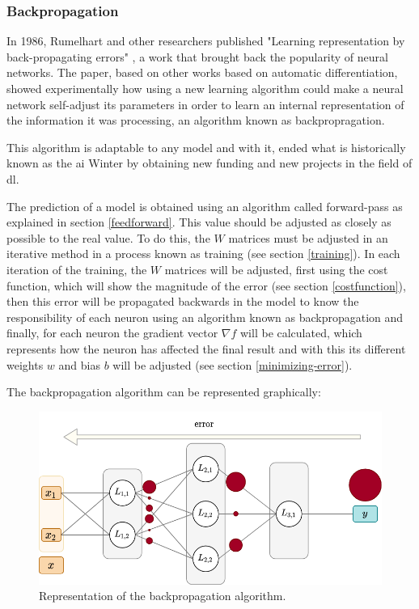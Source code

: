 \subsubsection{Backpropagation}\label{backpropagation}

In 1986, Rumelhart and other researchers published "Learning representation by back-propagating errors" \cite{rumelhart}, a work that brought back the popularity of neural networks. The paper, based on other works based on automatic differentiation, showed experimentally how using a new learning algorithm could make a neural network self-adjust its parameters in order to learn an internal representation of the information it was processing, an algorithm known as backpropragation.
\newline

This algorithm is adaptable to any model and with it, ended what is historically known as the \acrshort{ai} Winter by obtaining new funding and new projects in the field of \acrfull{dl}.
\newline

The prediction of a model is obtained using an algorithm called forward-pass as explained in section \ref{feedforward}. This value should be adjusted as closely as possible to the real value. To do this, the $W$ matrices must be adjusted in an iterative method in a process known as training (see section \ref{training}). In each iteration of the training, the $W$ matrices will be adjusted, first using the cost function, which will show the magnitude of the error (see section \ref{costfunction}), then this error will be propagated backwards in the model to know the responsibility of each neuron using an algorithm known as backpropagation and finally, for each neuron the gradient vector $\nabla f$ will be calculated, which represents how the neuron has affected the final result and with this its different weights $w$ and bias $b$ will be adjusted (see section \ref{minimizing-error}).
\newline


The backpropagation algorithm can be represented graphically:

\begin{figure}[H]
    \centering
    \includegraphics[width=14cm]{images/state-of-art/back-propagation/network_descent_gradient.png}
    \caption{Representation of the backpropagation algorithm.}
    \label{fig:basic_network}
\end{figure}

